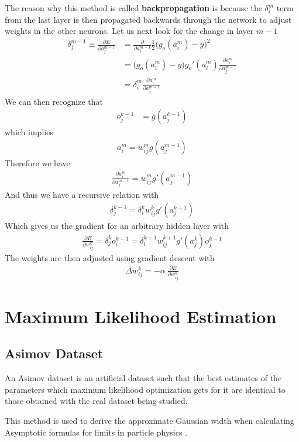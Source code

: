 The reason why this method is called \textbf{backpropagation} is because the $\delta_i^m$ term from the last layer is then propagated backwards through the network to adjust weights in the other neurons. Let us next look for the change in layer $m-1$
\begin{align}
	\delta_j^{m-1} \equiv \frac{\partial E}{\partial a_{j}^{m-1}} &= \frac{\partial}{\partial{a_i^{m-1}}}\frac{1}{2}\Big(g_o(a_{i}^m)-y\Big)^2 \\
	&=\Big(g_o(a_{i}^m)-y\Big)g_o'(a_{i}^m)\frac{\partial a_{i}^m}{\partial a_{j}^{m-1}}\\
	&= \delta_i^m \frac{\partial a_{i}^m}{\partial a_{j}^{m-1}}
\end{align}
We can then recognize that
\begin{align}
	o_j^{k-1} &= g(a_j^{k-1})
\end{align}
which implies
\begin{align}
	a_i^m = w_{ij}^m g(a_j^{m-1})
\end{align}
Therefore we have
\begin{align}
	\frac{\partial a_{i}^m}{\partial a_{j}^{m-1}} = w_{ij}^m g'(a_j^{m-1})
\end{align}
And thus we have a recursive relation with
\begin{align}
	\delta_j^{k-1} = \delta_i^k w_{ij}^k g'(a_j^{k-1})
\end{align}
Which gives us the gradient for an arbitrary hidden layer with
\begin{align}
	\frac{\partial E}{\partial w_{ij}^k} = \delta_j^{k}o_i^{k-1} = \delta_l^{k+1} w_{lj}^{k+1} g'(a_j^{k})o_j^{k-1}
\end{align}
The weights are then adjusted using gradient descent with
\begin{align}
	\Delta w_{ij}^k = -\alpha~  \frac{\partial E}{\partial w_{ij}^k}
\end{align}

\section{Maximum Likelihood Estimation}
\subsection{Asimov Dataset}
An Asimov dataset is an artificial dataset such that the  best estimates of the parameters which maximum likelihood optimization gets for it are identical to those obtained with the real dataset being studied. 

This method is used to derive the approximate Gaussian width when calculating Asymptotic formulas for limits in particle physics \cite{cowan}.
